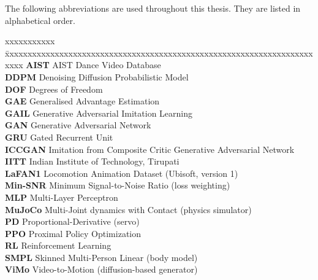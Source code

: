 \abbreviations
The following abbreviations are used throughout this thesis. They are listed in alphabetical order.
\noindent
\begin{tabbing}
xxxxxxxxxxx \= xxxxxxxxxxxxxxxxxxxxxxxxxxxxxxxxxxxxxxxxxxxxxxxxxxxxxxxxxxxxxxxxxxxxxxxx \kill
\textbf{AIST}     \> AIST Dance Video Database \\
\textbf{DDPM}     \> Denoising Diffusion Probabilistic Model \\
\textbf{DOF}      \> Degrees of Freedom \\
\textbf{GAE}      \> Generalised Advantage Estimation \\
\textbf{GAIL}     \> Generative Adversarial Imitation Learning \\
\textbf{GAN}      \> Generative Adversarial Network \\
\textbf{GRU}      \> Gated Recurrent Unit \\
\textbf{ICCGAN}   \> Imitation from Composite Critic Generative Adversarial Network \\
\textbf{IITT}     \> Indian Institute of Technology, Tirupati \\
\textbf{LaFAN1}   \> Locomotion Animation Dataset (Ubisoft, version 1) \\
\textbf{Min-SNR}  \> Minimum Signal-to-Noise Ratio (loss weighting) \\
\textbf{MLP}      \> Multi-Layer Perceptron \\
\textbf{MuJoCo}   \> Multi-Joint dynamics with Contact (physics simulator) \\
\textbf{PD}       \> Proportional-Derivative (servo) \\
\textbf{PPO}      \> Proximal Policy Optimization \\
\textbf{RL}       \> Reinforcement Learning \\
\textbf{SMPL}     \> Skinned Multi-Person Linear (body model) \\
\textbf{ViMo}     \> Video-to-Motion (diffusion-based generator) \\
\end{tabbing}

\pagebreak
